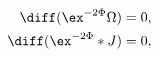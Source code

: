 \begin{equation}
\label{SUncond}
\begin{aligned}
   \diff (\ex^{-2\Phi}\Omega) &= 0 , \\
   \diff (\ex^{-2\Phi} * J) &= 0 ,
\end{aligned}
\end{equation}


